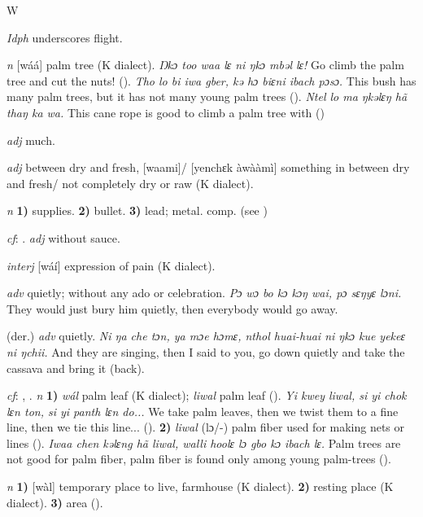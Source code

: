 \begin{letter}{W}

 \textit{Idph} underscores flight.

 \textit{n} [wáá] palm tree (K dialect). \textit{Ŋkɔ too waa lɛ ni ŋkɔ mbəl lɛ!} Go climb the palm tree and cut the nuts! (\citealt{Pichl1967}). \textit{Tho lo bi iwa gber, kə hɔ biɛni ibach pɔsɔ.} This bush has many palm trees, but it has not many young palm trees (\citealt{Pichl1967}). \textit{Ntel lo ma ŋkəlɛŋ hã thaŋ ka wa.} This cane rope is good to climb a palm tree with (\citealt{Pichl1967})

 \textit{adj} much.

 \textit{adj} between dry and fresh, [waami]/ [yenchɛk àwààmì] something in between dry and fresh/ not completely dry or raw (K dialect).

 \textit{n} \textbf{1)} supplies. \textbf{2)} bullet. \textbf{3)} lead; metal. comp.  (see ) 

 \textit{cf}: . \textit{adj} without sauce.

 \textit{interj} [wáí] expression of pain (K dialect). 

 \textit{adv} quietly; without any ado or celebration. \textit{Pɔ wɔ bo kɔ kɔŋ wai, pɔ sɛŋyɛ lɔni.} They would just bury him quietly, then everybody would go away.

 (der.) \textit{adv} quietly. \textit{Ni ŋa che tɔn, ya mɔe hɔmɛ, nthol huai-huai ni ŋkɔ kue yekeɛ ni ŋchii.} And they are singing, then I said to you, go down quietly and take the cassava and bring it (back).

 \textit{cf}: , . \textit{n} \textbf{1)} \textit{wál} palm leaf (K dialect); \textit{liwal} palm leaf (\citealt{Sumner1921}). \textit{Yi kwey liwal, si yi chok lɛn ton, si yi panth lɛn do...} We take palm leaves, then we twist them to a fine line, then we tie this line... (\citealt{Pichl1967}). \textbf{2)} \textit{liwal} (lɔ/-) palm fiber used for making nets or lines (\citealt{Pichl1967}). \textit{Iwaa chen kəlɛng hã liwal, walli hoolɛ lɔ gbo kɔ ibach lɛ.} Palm trees are not good for palm fiber, palm fiber is found only among young palm-trees (\citealt{Pichl1967}). 

 \textit{n} \textbf{1)} [wàl] temporary place to live, farmhouse (K dialect). \textbf{2)} resting place (K dialect). \textbf{3)} area (\citealt{Pichl1967}). 


\end{letter}
